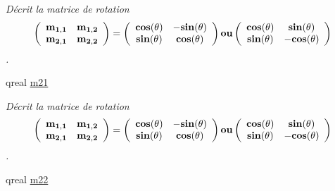 \begin{DoxyCompactItemize}
\begin{DoxyCompactList}\small\item\em Décrit la matrice de rotation \[ \bf \left( \begin{array}{ccc} \bf m_{1,1} & \bf m_{1,2} \\ \bf m_{2,1} & \bf m_{2,2} \\ \end{array} \bf\right) \bf= \bf\left( \begin{array}{ccc} \bf cos(\bf\theta) & \bf -sin(\bf\theta) \\ \bf sin(\bf\theta) & \bf cos(\bf\theta) \\ \end{array} \bf\right) \bf ou \bf\left( \begin{array}{ccc} \bf cos(\bf\theta) & \bf sin(\bf\theta) \\ \bf sin(\bf\theta) & \bf -cos(\bf\theta) \\ \end{array} \bf\right) \]. \end{DoxyCompactList}\item 
\hypertarget{class_application_a57f2364c5671f6ade315024cff46c975}{}qreal \hyperlink{class_application_a57f2364c5671f6ade315024cff46c975}{m21}\label{class_application_a57f2364c5671f6ade315024cff46c975}

\begin{DoxyCompactList}\small\item\em Décrit la matrice de rotation \[ \bf \left( \begin{array}{ccc} \bf m_{1,1} & \bf m_{1,2} \\ \bf m_{2,1} & \bf m_{2,2} \\ \end{array} \bf\right) \bf= \bf\left( \begin{array}{ccc} \bf cos(\bf\theta) & \bf -sin(\bf\theta) \\ \bf sin(\bf\theta) & \bf cos(\bf\theta) \\ \end{array} \bf\right) \bf ou \bf\left( \begin{array}{ccc} \bf cos(\bf\theta) & \bf sin(\bf\theta) \\ \bf sin(\bf\theta) & \bf -cos(\bf\theta) \\ \end{array} \bf\right) \]. \end{DoxyCompactList}\item 
\hypertarget{class_application_aa3e7dad170dc62450e06855fdeea42af}{}qreal \hyperlink{class_application_aa3e7dad170dc62450e06855fdeea42af}{m22}\label{class_application_aa3e7dad170dc62450e06855fdeea42af}


\end{DoxyCompactItemize}

